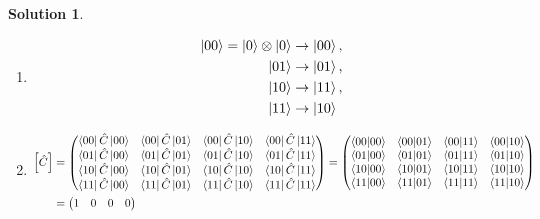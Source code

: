 \documentclass[10pt]{article}
\theoremstyle{definition}
\newtheorem{soln}{Solution}
\begin{document}
\begin{soln}~
  \begin{enumerate}[label=(\roman*)]
    \item \begin{align*}
            \ket{00}=\ket{0}\otimes \ket{0} & \to \ket{00}, \\
            \ket{01}                        & \to \ket{01}, \\
            \ket{10}                        & \to \ket{11}, \\
            \ket{11}                        & \to \ket{10}  \\
          \end{align*}
    \item \begin{align*}
            \left[\hat{C}\right] & =\begin{pmatrix}
                                      \bra{00}\hat{C}\ket{00} & \bra{00}\hat{C}\ket{01} & \bra{00}\hat{C}\ket{10} & \bra{00}\hat{C}\ket{11} \\
                                      \bra{01}\hat{C}\ket{00} & \bra{01}\hat{C}\ket{01} & \bra{01}\hat{C}\ket{10} & \bra{01}\hat{C}\ket{11} \\
                                      \bra{10}\hat{C}\ket{00} & \bra{10}\hat{C}\ket{01} & \bra{10}\hat{C}\ket{10} & \bra{10}\hat{C}\ket{11} \\
                                      \bra{11}\hat{C}\ket{00} & \bra{11}\hat{C}\ket{01} & \bra{11}\hat{C}\ket{10} & \bra{11}\hat{C}\ket{11} \\
                                    \end{pmatrix}=
            \begin{pmatrix}
              \bra{00}\ket{00} & \bra{00}\ket{01} & \bra{00}\ket{11} & \bra{00}\ket{10} \\
              \bra{01}\ket{00} & \bra{01}\ket{01} & \bra{01}\ket{11} & \bra{01}\ket{10} \\
              \bra{10}\ket{00} & \bra{10}\ket{01} & \bra{10}\ket{11} & \bra{10}\ket{10} \\
              \bra{11}\ket{00} & \bra{11}\ket{01} & \bra{11}\ket{11} & \bra{11}\ket{10} \\
            \end{pmatrix}                                                     \\
                                 & =\begin{pmatrix}
                                      1 & 0 & 0 & 0 \\

\end{pmatrix}
\end{align*}
\end{enumerate}
\end{soln}
\end{document}
